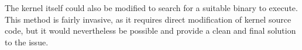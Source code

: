\documentclass[a4paper,twoside,titlepage]{article}
\begin{document}
The kernel itself could also be modified to search for a suitable binary to
execute. This method is fairly invasive, as it requires direct modification of
kernel source code, but it would nevertheless be possible and provide a clean and
final solution to the issue.

\newpage

\begin{thebibliography}{alpha}

\end{thebibliography}
\end{document}
